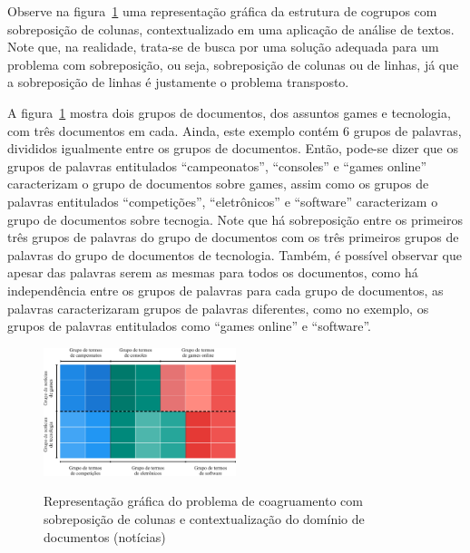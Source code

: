 \documentclass[
    12pt,                %
    oneside,            %
    a4paper,            %
    english,            %
    brazil                %
    ]{abntex2ppgsi}
\begin{document}
Observe na figura~\ref{fig:ovnmtfApplication} uma representação gráfica da estrutura de cogrupos com sobreposição de colunas, contextualizado em uma aplicação de análise de textos.
Note que, na realidade, trata-se de busca por uma solução adequada para um problema com sobreposição, ou seja, sobreposição de colunas ou de linhas, já que a sobreposição de linhas é justamente o problema transposto.

A figura~\ref{fig:ovnmtfApplication} mostra dois grupos de documentos, dos assuntos games e tecnologia, com três documentos em cada.
Ainda, este exemplo contém $6$ grupos de palavras, divididos igualmente entre os grupos de documentos.
Então, pode-se dizer que os grupos de palavras entitulados ``campeonatos'', ``consoles'' e ``games online'' caracterizam o grupo de documentos sobre games, assim como os grupos de palavras entitulados ``competições'', ``eletrônicos'' e ``software'' caracterizam o grupo de documentos sobre tecnogia.
Note que há sobreposição entre os primeiros três grupos de palavras do grupo de documentos com os três primeiros grupos de palavras do grupo de documentos de tecnologia.
Também, é possível observar que apesar das palavras serem as mesmas para todos os documentos, como há independência entre os grupos de palavras para cada grupo de documentos, as palavras caracterizaram grupos de palavras diferentes, como no exemplo, os grupos de palavras entitulados como ``games online'' e ``software''.


\begin{figure}[H]
\centering
\caption{Representação gráfica do problema de coagruamento com sobreposição de colunas e contextualização do domínio de documentos (notícias)}
\includegraphics[width=0.5\textwidth]{img/ovnmtfNewsApplication.png}
\label{fig:ovnmtfApplication}
\end{figure}
\end{document}
